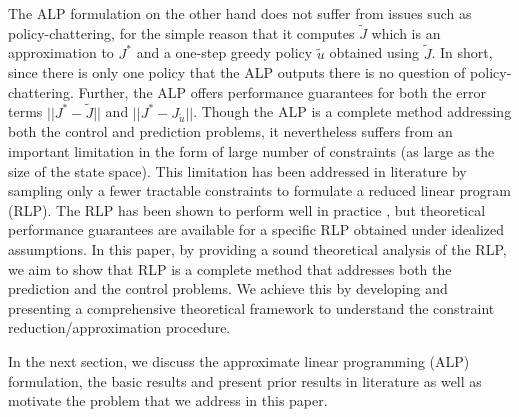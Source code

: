 The ALP formulation \cite{ALP} on the other hand does not suffer from issues such as policy-chattering, for the simple reason that it computes $\tilde{J}$ which is an approximation to $J^*$ and a one-step greedy policy $\tilde{u}$ obtained using $\tilde{J}$. In short, since there is only one policy that the ALP outputs there is no question of policy-chattering. Further, the ALP offers performance guarantees for both the error terms $||J^*-\tilde{J}||$ and $||J^*-J_{\tilde{u}}||$. Though the ALP is a complete method addressing both the control and prediction problems, it nevertheless suffers from an important limitation in the form of large number of constraints (as large as the size of the state space). This limitation has been addressed in literature by sampling only a fewer tractable constraints to formulate a reduced linear program (RLP). The RLP has been shown to perform well in practice \cite{ALP,CS,CST}, but theoretical performance guarantees \cite{CS} are available for a specific RLP obtained under idealized assumptions. In this paper, by providing a sound theoretical analysis of the RLP, we aim to show that RLP is a complete method that addresses both the prediction and the control problems.
We achieve this by developing and presenting a comprehensive theoretical framework to understand the constraint reduction/approximation procedure.

In the next section, we discuss the approximate linear programming (ALP) formulation, the basic results and present prior results in literature as well as motivate the problem that we address in this paper. 
